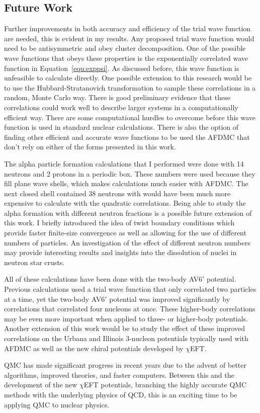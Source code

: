\subsection{Future Work}
Further improvements in both accuracy and efficiency of the trial wave function are needed, this is evident in my results. Any proposed trial wave function would need to be antisymmetric and obey cluster decomposition. One of the possible wave functions that obeys these properties is the exponentially correlated wave function in Equation~\ref{equ:exppsi}. As discussed before, this wave function is unfeasible to calculate directly. One possible extension to this research would be to use the Hubbard-Stratanovich transformation to sample these correlations in a random, Monte Carlo way. There is good preliminary evidence that these correlations could work well to describe larger systems in a computationally efficient way. There are some computational hurdles to overcome before this wave function is used in standard nuclear calculations. There is also the option of finding other efficient and accurate wave functions to be used the AFDMC that don't rely on either of the forms presented in this work.

The alpha particle formation calculations that I performed were done with 14 neutrons and 2 protons in a periodic box. These numbers were used because they fill plane wave shells, which makes calculations much easier with AFDMC. The next closed shell contained 38 neutrons with would have been much more expensive to calculate with the quadratic correlations. Being able to study the alpha formation with different neutron fractions is a possible future extension of this work. I briefly introduced the idea of twist boundary conditions which provide faster finite-size convergence as well as allowing for the use of different numbers of particles. An investigation of the effect of different neutron numbers may provide interesting results and insights into the dissolution of nuclei in neutron star crusts.

All of these calculations have been done with the two-body AV6$'$ potential. Previous calculations used a trial wave function that only correlated two particles at a time, yet the two-body AV6$'$ potential was improved significantly by correlations that correlated four nucleons at once. These higher-body correlations may be even more important when applied to three- or higher-body potentials. Another extension of this work would be to study the effect of these improved correlations on the Urbana and Illinois 3-nucleon potentials typically used with AFDMC as well as the new chiral potentials developed by $\chi$EFT.

QMC has made significant progress in recent years due to the advent of better algorithms, improved theories, and faster computers. Between this and the development of the new $\chi$EFT potentials, branching the highly accurate QMC methods with the underlying physics of QCD, this is an exciting time to be applying QMC to nuclear physics.
